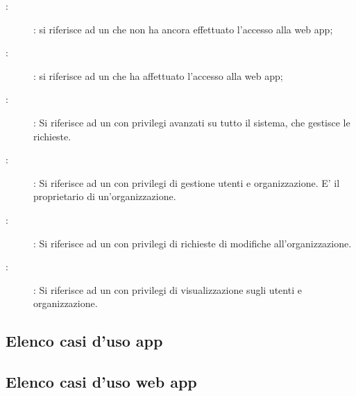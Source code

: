 \documentclass[../analisi-dei-requisiti]{subfiles}
\begin{document}
\begin{description}
  \item[:]: si riferisce ad un  che non ha ancora effettuato l'accesso alla web app;
  \item[:]: si riferisce ad un  che ha affettuato l'accesso alla web app;
  \item[:]: Si riferisce ad un  con privilegi avanzati su tutto il sistema, che gestisce le richieste.
  \item[:]: Si riferisce ad un  con privilegi di gestione utenti e organizzazione. E' il proprietario di un'organizzazione.
  \item[:]: Si riferisce ad un  con privilegi di richieste di modifiche all'organizzazione.
  \item[:]: Si riferisce ad un  con privilegi di visualizzazione sugli utenti e organizzazione.
\end{description}


\subsection{Elenco casi d'uso app}%
\label{sub:casi_duso_app}

\subsection{Elenco casi d'uso web app}%
\label{sub:casi_duso_web_app}

\end{document}
